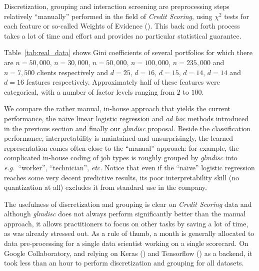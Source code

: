 Discretization, grouping and interaction screening are preprocessing steps relatively ``manually'' performed in the field of \textit{Credit Scoring}, using $\chi^2$ tests for each feature or so-called Weights of Evidence (\cite{zeng2014necessary}). This back and forth process takes a lot of time and effort and provides no particular statistical guarantee.

Table~\ref{tab:real_data} shows Gini coefficients of several portfolios for which there are $n=50,000$, $n=30,000$, $n=50,000$, $n=100,000$, $n=235,000$ and $n=7,500$ clients respectively and $d=25$, $d=16$, $d=15$, $d=14$, $d=14$ and $d=16$ features respectively. Approximately half of these features were categorical, with a number of factor levels ranging from $2$ to $100$. 

We compare the rather manual, in-house approach that yields the current performance, the na\"{\i}ve linear logistic regression and \textit{ad hoc} methods introduced in the previous section and finally our \textit{glmdisc} proposal. Beside the classification performance, interpretability is maintained and unsurprisingly, the learned representation comes often close to the ``manual'' approach: for example, the complicated in-house coding of job types is roughly grouped by \textit{glmdisc} into \textit{e.g.}\ ``worker'', ``technician'', \textit{etc.} Notice that even if the ``na\"{\i}ve'' logistic regression reaches some very decent predictive results, its poor interpretability skill (no quantization at all) excludes it from standard use in the company.

The usefulness of discretization and grouping is clear on \textit{Credit Scoring} data and although \textit{glmdisc} does not always perform significantly better than the manual approach, it allows practitioners to focus on other tasks by saving a lot of time, as was already stressed out. As a rule of thumb, a month is generally allocated to data pre-processing for a single data scientist working on a single scorecard. On Google Collaboratory, and relying on Keras (\cite{chollet2015keras}) and Tensorflow (\cite{tensorflow2015-whitepaper}) as a backend, it took less than an hour to perform discretization and grouping for all datasets.

